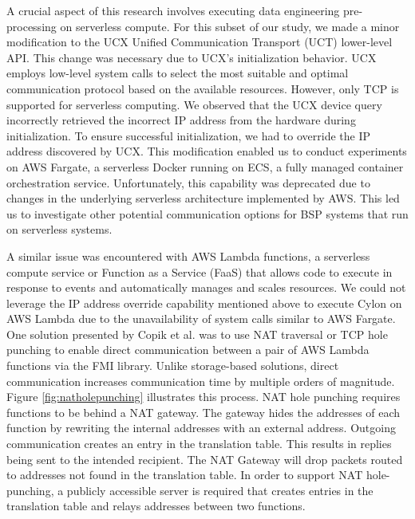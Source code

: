 A crucial aspect of this research involves executing data engineering pre-processing on serverless compute. For this subset of our study, we made a minor modification to the UCX Unified Communication Transport (UCT) lower-level API. This change was necessary due to UCX’s initialization behavior. UCX employs low-level system calls to select the most suitable and optimal communication protocol based on the available resources. However, only TCP is supported for serverless computing. We observed that the UCX device query incorrectly retrieved the incorrect IP address from the hardware during initialization. To ensure successful initialization, we had to override the IP address discovered by UCX. This modification enabled us to conduct experiments on AWS Fargate, a serverless Docker running on ECS, a fully managed container orchestration service. Unfortunately, this capability was deprecated due to changes in the underlying serverless architecture implemented by AWS.  This led us to investigate other potential communication options for BSP systems that run on serverless systems.

A similar issue was encountered with AWS Lambda functions, a serverless compute service or Function as a Service (FaaS) that allows code to execute in response to events and automatically manages and scales resources. We could not leverage the IP address override capability mentioned above to execute Cylon on AWS Lambda due to the unavailability of system calls similar to AWS Fargate. One solution presented by Copik et al. was to use NAT traversal or TCP hole punching to enable direct communication between a pair of AWS Lambda functions via the FMI library. Unlike storage-based solutions, direct communication increases communication time by multiple orders of magnitude.  Figure \ref{fig:natholepunching} illustrates this process.  NAT hole punching requires functions to be behind a NAT gateway.  The gateway hides the addresses of each function by rewriting the internal addresses with an external address.  Outgoing communication creates an entry in the translation table.  This results in replies being sent to the intended recipient.  The NAT Gateway will drop packets routed to addresses not found in the translation table.  In order to support NAT hole-punching, a publicly accessible server is required that creates entries in the translation table and relays addresses between two functions.  


